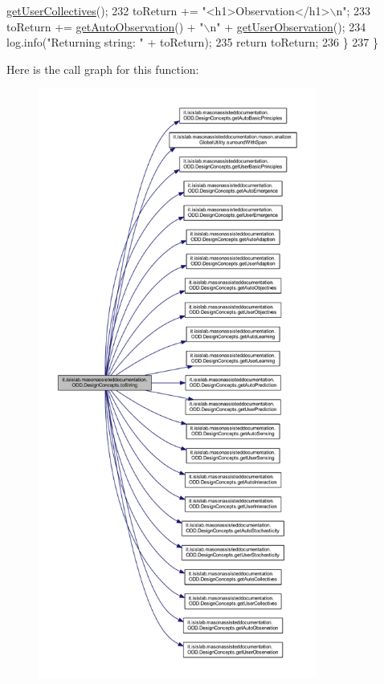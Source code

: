 \begin{DoxyCode}
      \hyperlink{classit_1_1isislab_1_1masonassisteddocumentation_1_1_o_d_d_1_1_design_concepts_a508566b6e3ba02f79c3fc1702575546d}{getUserCollectives}();
232             toReturn += \textcolor{stringliteral}{"<h1>Observation</h1>\(\backslash\)n"};
233             toReturn += \hyperlink{classit_1_1isislab_1_1masonassisteddocumentation_1_1_o_d_d_1_1_design_concepts_ad998a2c1b1bcd74fa4f31452282f9cf0}{getAutoObservation}() + \textcolor{stringliteral}{"\(\backslash\)n"} + 
      \hyperlink{classit_1_1isislab_1_1masonassisteddocumentation_1_1_o_d_d_1_1_design_concepts_a0488c6b3bbfe06fc632aeae338e359bb}{getUserObservation}();
234             log.info(\textcolor{stringliteral}{"Returning string: "} + toReturn);
235             \textcolor{keywordflow}{return} toReturn;
236         \}
237     \}
\end{DoxyCode}


Here is the call graph for this function\-:
\nopagebreak
\begin{figure}[H]
\begin{center}
\leavevmode
\includegraphics[height=550pt]{classit_1_1isislab_1_1masonassisteddocumentation_1_1_o_d_d_1_1_design_concepts_ab2ce9b59335e8629f53d9273bc6e7c40_cgraph}
\end{center}
\end{figure}




